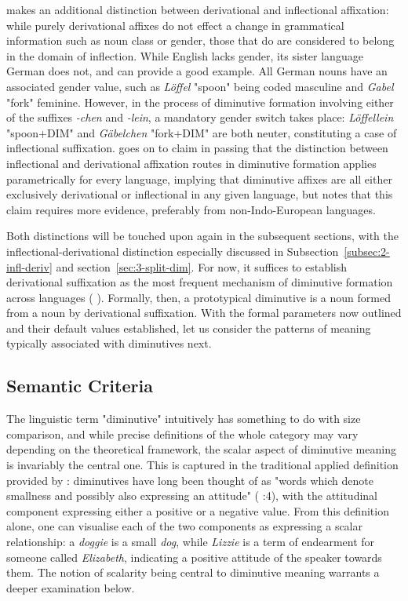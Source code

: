 \citeauthor{Schneider+2003} makes an additional distinction between derivational and inflectional affixation: while purely derivational affixes do not effect a change in grammatical information such as noun class or gender, those that do are considered to belong in the domain of inflection. While English lacks gender, its sister language German does not, and can provide a good example. All German nouns have an associated gender value, such as \textit{Löffel} "spoon" being coded masculine and \textit{Gabel} "fork" feminine. However, in the process of diminutive formation involving either of the suffixes \textit{-chen} and \textit{-lein}, a mandatory gender switch takes place: \textit{Löffellein} "spoon+DIM" and \textit{Gäbelchen} "fork+DIM" are both neuter, constituting a case of inflectional suffixation. \citeauthor{Schneider+2003} goes on to claim in passing that the distinction between inflectional and derivational affixation routes in diminutive formation applies parametrically for every language, implying that diminutive affixes are all either exclusively derivational or inflectional in any given language, but notes that this claim requires more evidence, preferably from non-Indo-European languages.

Both distinctions will be touched upon again in the subsequent sections, with the inflectional-derivational distinction especially discussed in Subsection~\ref{subsec:2-infl-deriv} and section~\ref{sec:3-split-dim}. For now, it suffices to establish derivational suffixation as the most frequent mechanism of diminutive formation across languages (\citeauthor{Schneider+2003} \citeyear{Schneider+2003}). Formally, then, a prototypical diminutive is a noun formed from a noun by derivational suffixation. With the formal parameters now outlined and their default values established, let us consider the patterns of meaning typically associated with diminutives next.

\subsection{Semantic Criteria}
\label{subsec:2-semantic-crit}
The linguistic term "diminutive" intuitively has something to do with size comparison, and while precise definitions of the whole category may vary depending on the theoretical framework, the scalar aspect of diminutive meaning is invariably the central one. This is captured in the traditional applied definition provided by \citeauthor{Schneider+2003}: diminutives have long been thought of as "words which denote smallness and possibly also expressing an attitude" (\citeauthor{Schneider+2003} \citeyear{Schneider+2003}:4), with the attitudinal component expressing either a positive or a negative value. From this definition alone, one can visualise each of the two components as expressing a scalar relationship: a \textit{doggie} is a small \textit{dog}, while \textit{Lizzie} is a term of endearment for someone called \textit{Elizabeth}, indicating a positive attitude of the speaker towards them. The notion of scalarity being central to diminutive meaning warrants a deeper examination below.

